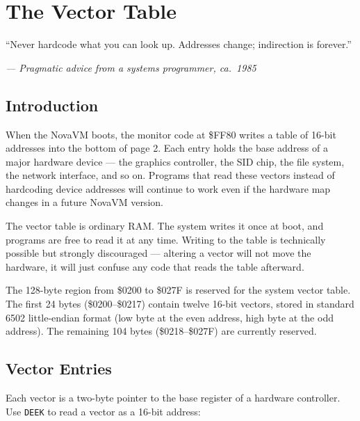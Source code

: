 \chapter{The Vector Table}

\epigraph{``Never hardcode what you can look up.  Addresses change; indirection
is forever.''}{\textit{--- Pragmatic advice from a systems programmer, ca.\ 1985}}

\section*{Introduction}

When the NovaVM boots, the monitor code at \$FF80 writes a table of 16-bit
addresses into the bottom of page 2.  Each entry holds the base address of a
major hardware device --- the graphics controller, the SID chip, the file
system, the network interface, and so on.  Programs that read these vectors
instead of hardcoding device addresses will continue to work even if the
hardware map changes in a future NovaVM version.

The vector table is ordinary RAM.  The system writes it once at boot, and
programs are free to read it at any time.  Writing to the table is technically
possible but strongly discouraged --- altering a vector will not move the
hardware, it will just confuse any code that reads the table afterward.

The 128-byte region from \$0200 to \$027F is reserved for the system vector
table.  The first 24 bytes (\$0200--\$0217) contain twelve 16-bit vectors,
stored in standard 6502 little-endian format (low byte at the even address,
high byte at the odd address).  The remaining 104 bytes (\$0218--\$027F) are
currently reserved.
\label{addr:VecTable}%
%

\section{Vector Entries}

Each vector is a two-byte pointer to the base register of a hardware
controller.  Use \texttt{DEEK} to read a vector as a 16-bit address:


